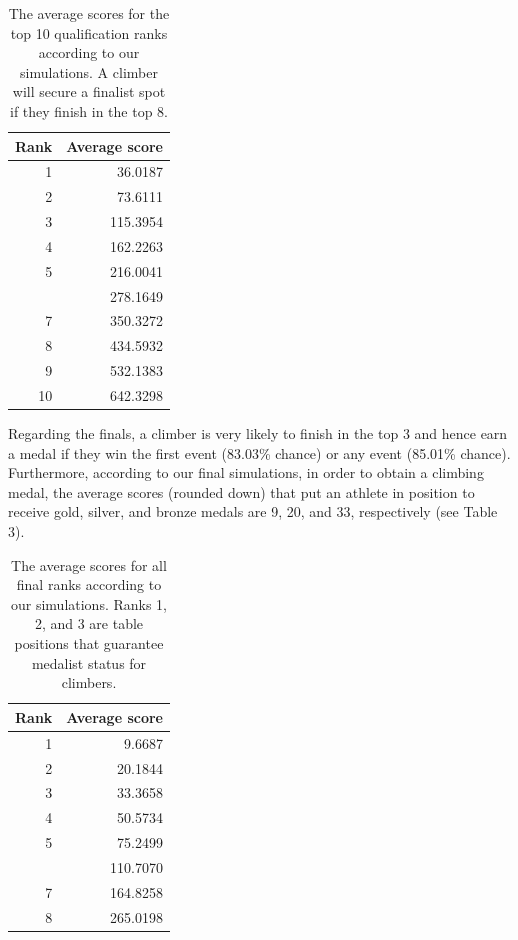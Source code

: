\documentclass[12pt]{article}
\begin{document}
\begin{table}[H]

\caption{\label{tab:unnamed-chunk-6}The average scores for the top 10 qualification ranks according to our simulations. A climber will secure a finalist spot if they finish in the top 8.}
\centering
\begin{tabular}[t]{rr}
\toprule
Rank & Average score\\
\midrule
1 & 36.0187\\
2 & 73.6111\\
3 & 115.3954\\
4 & 162.2263\\
5 & 216.0041\\
\addlinespace
6 & 278.1649\\
7 & 350.3272\\
8 & 434.5932\\
9 & 532.1383\\
10 & 642.3298\\
\bottomrule
\end{tabular}
\end{table}

Regarding the finals, a climber is very likely to finish in the top 3
and hence earn a medal if they win the first event (83.03\% chance) or
any event (85.01\% chance). Furthermore, according to our final
simulations, in order to obtain a climbing medal, the average scores
(rounded down) that put an athlete in position to receive gold, silver,
and bronze medals are 9, 20, and 33, respectively (see Table 3).

\begin{table}

\caption{\label{tab:unnamed-chunk-7}The average scores for all final ranks according to our simulations. Ranks 1, 2, and 3 are table positions that guarantee medalist status for climbers.}
\centering
\begin{tabular}[t]{rr}
\toprule
Rank & Average score\\
\midrule
1 & 9.6687\\
2 & 20.1844\\
3 & 33.3658\\
4 & 50.5734\\
5 & 75.2499\\
\addlinespace
6 & 110.7070\\
7 & 164.8258\\
8 & 265.0198\\
\bottomrule
\end{tabular}
\end{table}
\end{document}
